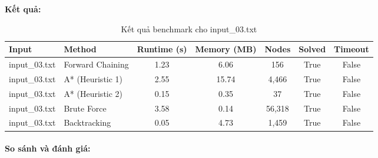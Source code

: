 \begin{center}
\end{center}

\textbf{Kết quả:}
\begin{table}[H]
\centering
\begin{tabular}{|l|l|c|c|c|c|c|}
\hline
\textbf{Input} & \textbf{Method} & \textbf{Runtime (s)} & \textbf{Memory (MB)} & \textbf{Nodes} & \textbf{Solved} & \textbf{Timeout} \\
\hline
input\_03.txt & Forward Chaining & 1.23 & 6.06 & 156 & True & False \\
input\_03.txt & A* (Heuristic 1) & 2.55 & 15.74 & 4,466 & True & False \\
input\_03.txt & A* (Heuristic 2) & 0.15 & 0.35 & 37 & True & False \\
input\_03.txt & Brute Force & 3.58 & 0.14 & 56,318 & True & False \\
input\_03.txt & Backtracking & 0.05 & 4.73 & 1,459 & True & False \\
\hline
\end{tabular}
\caption{Kết quả benchmark cho input\_03.txt}
\end{table}

\paragraph{So sánh và đánh giá:}

